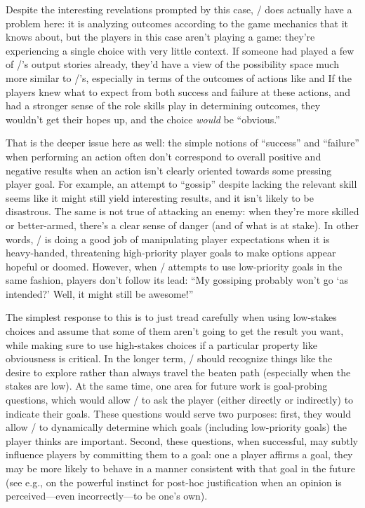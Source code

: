 Despite the interesting revelations prompted by this case, \dunyazad/ does actually have a problem here: it is analyzing outcomes according to the game mechanics that it knows about, but the players in this case aren't playing a game: they're experiencing a single choice with very little context.
%
If someone had played a few of \dunyazad/'s output stories already, they'd have a view of the possibility space much more similar to \dunyazad/'s, especially in terms of the outcomes of actions like  and 
%
If the players knew what to expect from both success and failure at these actions, and had a stronger sense of the role skills play in determining outcomes, they wouldn't get their hopes up, and the choice \emph{would} be ``obvious.''


That is the deeper issue here as well: the simple notions of ``success'' and ``failure'' when performing an action often don't correspond to overall positive and negative results when an action isn't clearly oriented towards some pressing player goal.
%
For example, an attempt to ``gossip'' despite lacking the relevant skill seems like it might still yield interesting results, and it isn't likely to be disastrous.
%
The same is not true of attacking an enemy: when they're more skilled or better-armed, there's a clear sense of danger (and of what is at stake).
%
In other words, \dunyazad/ is doing a good job of manipulating player expectations when it is heavy-handed, threatening high-priority player goals to make options appear hopeful or doomed.
%
However, when \dunyazad/ attempts to use low-priority goals in the same fashion, players don't follow its lead: ``My gossiping probably won't go `as intended?' Well, it might still be awesome!''


The simplest response to this is to just tread carefully when using low-stakes choices and assume that some of them aren't going to get the result you want, while making sure to use high-stakes choices if a particular property like obviousness is critical.
%
In the longer term, \dunyazad/ should recognize things like the desire to explore rather than always travel the beaten path (especially when the stakes are low).
%
At the same time, one area for future work is goal-probing questions, which would allow \dunyazad/ to ask the player (either directly or indirectly) to indicate their goals.
%
These questions would serve two purposes: first, they would allow \dunyazad/ to dynamically determine which goals (including low-priority goals) the player thinks are important.
%
Second, these questions, when successful, may subtly influence players by committing them to a goal: one a player affirms a goal, they may be more likely to behave in a manner consistent with that goal in the future (see e.g., \citep{Hall2012} on the powerful instinct for post-hoc justification when an opinion is perceived---even incorrectly---to be one's own).


